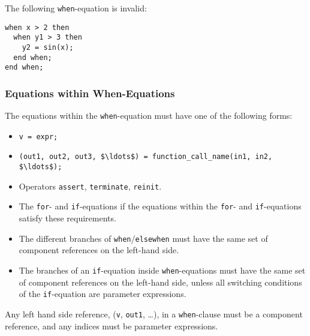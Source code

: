 \begin{example}
The following \lstinline!when!-equation is invalid:
\begin{lstlisting}[language=modelica]
when x > 2 then
  when y1 > 3 then
    y2 = sin(x);
  end when;
end when;
\end{lstlisting}
\end{example}

\subsubsection{Equations within When-Equations}\label{restrictions-on-equations-within-when-equations}\label{equations-within-when-equations}

The equations within the \lstinline!when!-equation must have one of the following forms:
\begin{itemize}
\item
  \lstinline!v = expr;!
\item
  \lstinline!(out1, out2, out3, $\ldots$) = function_call_name(in1, in2, $\ldots$);!
\item
  Operators \lstinline!assert!, \lstinline!terminate!, \lstinline!reinit!.
\item
  The \lstinline!for!- and \lstinline!if!-equations if the equations within the \lstinline!for!- and \lstinline!if!-equations satisfy these requirements.
\item
  The different branches of \lstinline!when!/\lstinline!elsewhen! must have the same set of component references on the left-hand side.
\item
  The branches of an \lstinline!if!-equation inside \lstinline!when!-equations must have the same set of component references on the left-hand side, unless all switching conditions of the \lstinline!if!-equation are parameter expressions.
\end{itemize}

Any left hand side reference, (\lstinline!v!, \lstinline!out1!, \ldots), in a \lstinline!when!-clause must be a component reference, and any indices must be parameter expressions.

